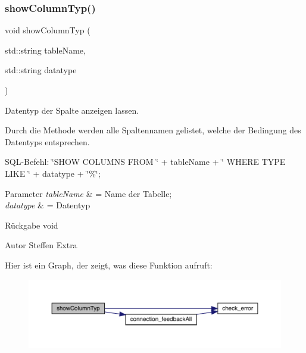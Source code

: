 \subsubsection{show\+Column\+Typ()}
{\footnotesize\ttfamily void show\+Column\+Typ (\begin{DoxyParamCaption}\item[{std\+::string}]{table\+Name,  }\item[{std\+::string}]{datatype }\end{DoxyParamCaption})}



Datentyp der Spalte anzeigen lassen. 

Durch die Methode werden alle Spaltennamen gelistet, welche der Bedingung des Datentyps entsprechen.~\newline


S\+Q\+L-\/\+Befehl\+: \char`\"{}\+S\+H\+O\+W C\+O\+L\+U\+M\+N\+S F\+R\+O\+M \char`\"{} + table\+Name + \char`\"{} W\+H\+E\+R\+E T\+Y\+P\+E L\+I\+K\+E \textquotesingle{}\char`\"{} + datatype + \char`\"{}\%\textquotesingle{}\char`\"{};


\begin{DoxyParams}{Parameter}
{\em table\+Name} & = Name der Tabelle; \\
\hline
{\em datatype} & = Datentyp\\
\hline
\end{DoxyParams}
\begin{DoxyReturn}{Rückgabe}
void
\end{DoxyReturn}
\begin{DoxyAuthor}{Autor}
Steffen Extra 
\end{DoxyAuthor}
Hier ist ein Graph, der zeigt, was diese Funktion aufruft\+:\nopagebreak
\begin{figure}[H]
\begin{center}
\leavevmode
\includegraphics[width=350pt]{tables_8hpp_addc31570307c41c7327c3da4886ae7bf_cgraph}
\end{center}
\end{figure}
\mbox{\label{tables_8hpp_a22fbeb7f18a00bafd4864de51a3bca28}} 
